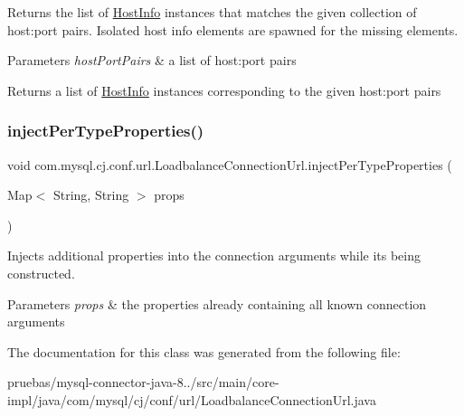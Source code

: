 Returns the list of \mbox{\hyperlink{classcom_1_1mysql_1_1cj_1_1conf_1_1_host_info}{Host\+Info}} instances that matches the given collection of host\+:port pairs. Isolated host info elements are spawned for the missing elements.


\begin{DoxyParams}{Parameters}
{\em host\+Port\+Pairs} & a list of host\+:port pairs \\
\hline
\end{DoxyParams}
\begin{DoxyReturn}{Returns}
a list of \mbox{\hyperlink{classcom_1_1mysql_1_1cj_1_1conf_1_1_host_info}{Host\+Info}} instances corresponding to the given host\+:port pairs 
\end{DoxyReturn}
\mbox{\label{classcom_1_1mysql_1_1cj_1_1conf_1_1url_1_1_loadbalance_connection_url_a01cbac35769ac60701e6ca72290025bd}} 
\subsubsection{\texorpdfstring{inject\+Per\+Type\+Properties()}{injectPerTypeProperties()}}
{\footnotesize\ttfamily void com.\+mysql.\+cj.\+conf.\+url.\+Loadbalance\+Connection\+Url.\+inject\+Per\+Type\+Properties (\begin{DoxyParamCaption}\item[{Map$<$ String, String $>$}]{props }\end{DoxyParamCaption})\hspace{0.3cm}{\ttfamily [protected]}}

Injects additional properties into the connection arguments while it\textquotesingle{}s being constructed.


\begin{DoxyParams}{Parameters}
{\em props} & the properties already containing all known connection arguments \\
\hline
\end{DoxyParams}


The documentation for this class was generated from the following file\+:\begin{DoxyCompactItemize}
\item 
pruebas/mysql-\/connector-\/java-\/8../src/main/core-\/impl/java/com/mysql/cj/conf/url/Loadbalance\+Connection\+Url.\+java\end{DoxyCompactItemize}
